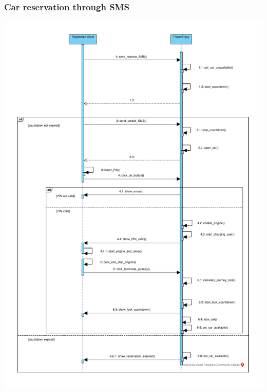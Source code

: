 \subsubsection{Car reservation through SMS}
\includegraphics[width=\textwidth, keepaspectratio]{../images/diagram/sequence/sms_reservation.pdf}



